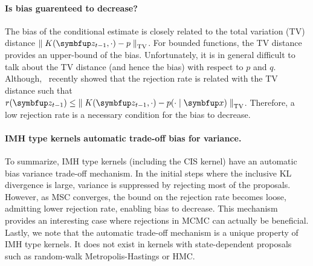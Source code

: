 \paragraph{Is bias guarenteed to decrease?}
The bias of the conditional estimate is closely related to the total variation (TV) distance \(\DTV{K(\vz_{t-1}, \cdot)}{p}\).
For bounded functions, the TV distance provides an upper-bound of the bias.
Unfortunately, it is in general difficult to talk about the TV distance (and hence the bias) with respect to \(p\) and \(q\).
Although,~\citet{wang_exact_2020} recently showed that the rejection rate is related with the TV distance such that \(r(\vz_{t-1}) \leq \DTV{K(\vz_{t-1}, \cdot)}{p(\cdot\mid\vx)}\).
Therefore, a low rejection rate is a necessary condition for the bias to decrease.

\paragraph{IMH type kernels automatic trade-off bias for variance.}
To summarize, IMH type kernels (including the CIS kernel) have an automatic bias variance trade-off mechanism.
In the initial steps where the inclusive KL divergence is large, variance is suppressed by rejecting most of the proposals.
However, as MSC converges, the bound on the rejection rate becomes loose, admitting lower rejection rate, enabling bias to decrease.
This mechanism provides an interesting case where rejections in MCMC can actually be beneficial.
Lastly, we note that the automatic trade-off mechanism is a unique property of IMH type kernels.
It does not exist in kernels with state-dependent proposals such as random-walk Metropolis-Hastings or HMC.




